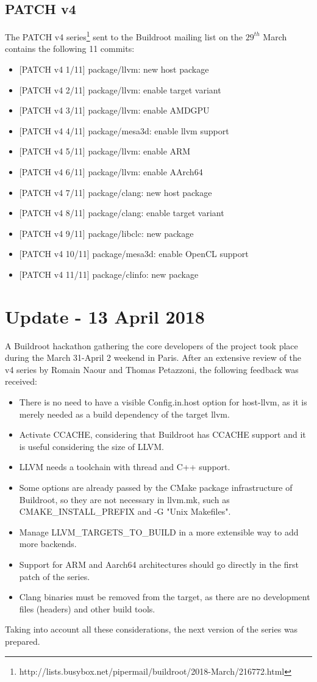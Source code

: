 \documentclass[12pt,a4paper,oneside]{article}
\begin{document}
\subsection*{PATCH v4}
The PATCH v4 series\footnote{http://lists.busybox.net/pipermail/buildroot/2018-March/216772.html}
sent to the Buildroot mailing list on the $29^{th}$ March contains the following
11 commits:
\begin{itemize}
  \item {[PATCH v4 1/11]} package/llvm: new host package
  \item {[PATCH v4 2/11]} package/llvm: enable target variant
  \item {[PATCH v4 3/11]} package/llvm: enable AMDGPU
  \item {[PATCH v4 4/11]} package/mesa3d: enable llvm support
  \item {[PATCH v4 5/11]} package/llvm: enable ARM
  \item {[PATCH v4 6/11]} package/llvm: enable AArch64
  \item {[PATCH v4 7/11]} package/clang: new host package
  \item {[PATCH v4 8/11]} package/clang: enable target variant
  \item {[PATCH v4 9/11]} package/libclc: new package
  \item {[PATCH v4 10/11]} package/mesa3d: enable OpenCL support
  \item {[PATCH v4 11/11]} package/clinfo: new package
\end{itemize}

\newpage
\section*{Update - 13 April 2018}
A Buildroot hackathon gathering the core developers of the project took place
during the March 31-April 2 weekend in Paris. After an extensive review of the
v4 series by Romain Naour and Thomas Petazzoni, the following feedback was
received:
\begin{itemize}
  \item There is no need to have a visible Config.in.host option for host-llvm,
  as it is merely needed as a build dependency of the target llvm.
  \item Activate CCACHE, considering that Buildroot has CCACHE support and it
  is useful considering the size of LLVM.
  \item LLVM needs a toolchain with thread and C++ support.
  \item Some options are already passed by the CMake package infrastructure of
  Buildroot, so they are not necessary in llvm.mk, such as CMAKE\_INSTALL\_PREFIX
  and -G "Unix Makefiles".
  \item Manage LLVM\_TARGETS\_TO\_BUILD in a more extensible way to add more backends.
  \item Support for ARM and Aarch64 architectures should go directly in the
  first patch of the series.
  \item Clang binaries must be removed from the target, as there are no development
  files (headers) and other build tools.
\end{itemize}
Taking into account all these considerations, the next version of the series
was prepared.
\end{document}
